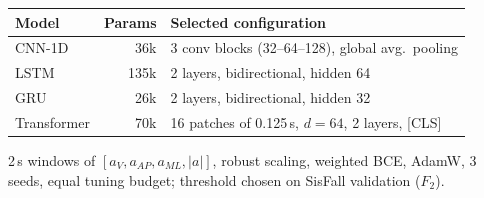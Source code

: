 \begin{tabular}{lrl}
\toprule
Model & Params & Selected configuration \\
\midrule
CNN-1D & 36k & 3 conv blocks (32--64--128), global avg.\ pooling \\
LSTM & 135k & 2 layers, bidirectional, hidden 64 \\
GRU & 26k & 2 layers, bidirectional, hidden 32 \\
Transformer & 70k & 16 patches of 0.125\,s, $d{=}64$, 2 layers, [CLS] \\
\bottomrule
\end{tabular}

\vspace{0.6ex}
\small 2\,s windows of $[a_V, a_{AP}, a_{ML}, |a|]$, robust scaling, weighted BCE, AdamW, 3 seeds,
equal tuning budget; threshold chosen on SisFall validation ($F_2$).
